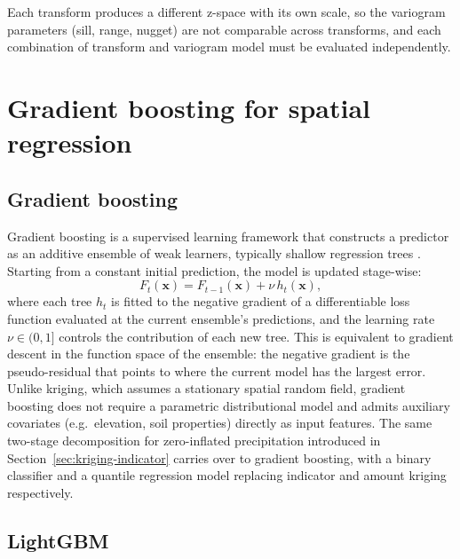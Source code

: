 Each transform produces a different z-space with its own scale, so the
variogram parameters (sill, range, nugget) are not comparable across
transforms, and each combination of transform and variogram model must
be evaluated independently.

\section{Gradient boosting for spatial regression}
\label{sec:theory-gbm}

\subsection{Gradient boosting}
\label{sec:theory-gbm-general}

Gradient boosting is a supervised learning framework that constructs a
predictor as an additive ensemble of weak learners, typically shallow
regression trees \cite{friedman2001greedy}. Starting from a constant initial
prediction, the model is updated stage-wise:
\begin{equation}
  F_t(\mathbf{x}) = F_{t-1}(\mathbf{x}) + \nu \, h_t(\mathbf{x}),
  \label{eq:gbm-additive}
\end{equation}
where each tree $h_t$ is fitted to the negative gradient of a differentiable
loss function evaluated at the current ensemble's predictions, and the
learning rate $\nu \in (0, 1]$ controls the contribution of each new tree.
This is equivalent to gradient descent in the function space of the
ensemble: the negative gradient is the pseudo-residual that points to where
the current model has the largest error.
Unlike kriging, which assumes a stationary spatial random field, gradient
boosting does not require a parametric distributional model and admits
auxiliary covariates (e.g.\ elevation, soil properties) directly as input
features.
The same two-stage decomposition for zero-inflated precipitation
introduced in Section~\ref{sec:kriging-indicator} carries over to gradient
boosting, with a binary classifier and a quantile regression model
replacing indicator and amount kriging respectively.

\subsection{LightGBM}
\label{sec:theory-lgbm}

